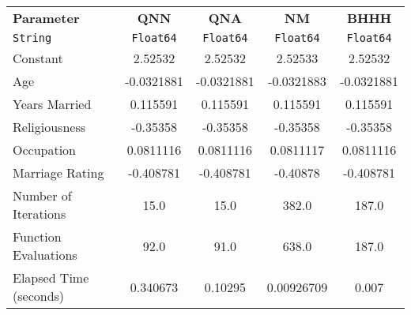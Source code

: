\begin{tabular}{lcccc}
  \hline
  \textbf{Parameter} & \textbf{QNN} & \textbf{QNA} & \textbf{NM} & \textbf{BHHH} \\
  \texttt{String} & \texttt{Float64} & \texttt{Float64} & \texttt{Float64} & \texttt{Float64} \\\hline
  Constant & 2.52532 & 2.52532 & 2.52533 & 2.52532 \\
  Age & -0.0321881 & -0.0321881 & -0.0321883 & -0.0321881 \\
  Years Married & 0.115591 & 0.115591 & 0.115591 & 0.115591 \\
  Religiousness & -0.35358 & -0.35358 & -0.35358 & -0.35358 \\
  Occupation & 0.0811116 & 0.0811116 & 0.0811117 & 0.0811116 \\
  Marriage Rating & -0.408781 & -0.408781 & -0.40878 & -0.408781 \\
  Number of Iterations & 15.0 & 15.0 & 382.0 & 187.0 \\
  Function Evaluations & 92.0 & 91.0 & 638.0 & 187.0 \\
  Elapsed Time (seconds) & 0.340673 & 0.10295 & 0.00926709 & 0.007 \\\hline
\end{tabular}

